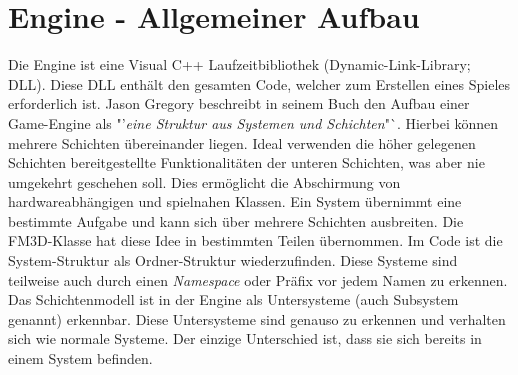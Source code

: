 \section{Engine - Allgemeiner Aufbau}

Die Engine ist eine Visual C++ Laufzeitbibliothek (Dynamic-Link-Library; DLL). Diese DLL enthält den gesamten Code, welcher zum Erstellen eines Spieles erforderlich ist. Jason Gregory beschreibt in seinem Buch den Aufbau einer Game-Engine als "'\textit{eine Struktur aus Systemen und Schichten}"`. 
Hierbei können mehrere Schichten übereinander liegen. Ideal verwenden die höher gelegenen Schichten bereitgestellte Funktionalitäten der unteren Schichten, was aber nie umgekehrt geschehen soll. Dies ermöglicht die Abschirmung von hardwareabhängigen und spielnahen Klassen. Ein System übernimmt eine bestimmte Aufgabe und kann sich über mehrere Schichten ausbreiten. \cite{gea}
Die FM3D-Klasse hat diese Idee in bestimmten Teilen übernommen. Im Code ist die System-Struktur als Ordner-Struktur wiederzufinden. Diese Systeme sind teilweise auch durch einen \textit{Namespace} oder Präfix vor jedem Namen zu erkennen. Das Schichtenmodell ist in der Engine als Untersysteme (auch Subsystem genannt) erkennbar. Diese Untersysteme sind genauso zu erkennen und verhalten sich wie normale Systeme. Der einzige Unterschied ist, dass sie sich bereits in einem System befinden.